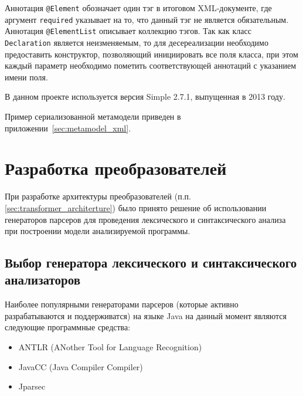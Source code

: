 Аннотация \texttt{@Element} обозначает один тэг в итоговом XML-документе, где
аргумент \texttt{required} указывает на то, что данный тэг не является
обязательным. Аннотация \texttt{@ElementList} описывает коллекцию тэгов. Так как
класс \texttt{Declaration} является неизменяемым, то для десереализации
необходимо предоставить конструктор, позволяющий инициировать все поля класса,
при этом каждый параметр необходимо пометить соответствующей аннотаций с
указанием имени поля.

В данном проекте используется версия Simple 2.7.1, выпущенная в 2013 году.

Пример сериализованной метамодели приведен в приложении~\ref{sec:metamodel_xml}.

\section{Разработка преобразователей}

При разработке архитектуры преобразователей
(п.п.\ref{sec:transformer_architerture}) было принято решение об использовании
генераторов парсеров для проведения лексического и синтаксического анализа при
построении модели анализируемой программы.

\subsection{Выбор генератора лексического и синтаксического анализаторов}

Наиболее популярными генераторами парсеров (которые активно разрабатываются и
поддерживатся) на языке Java на данный момент являются следующие программные
средства:


\begin{itemize}
    \item ANTLR (ANother Tool for Language Recognition)
    \item JavaCC (Java Compiler Compiler)
    \item Jparsec
\end{itemize}

